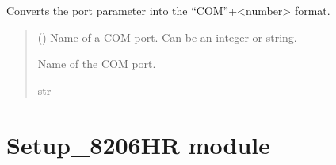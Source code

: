 \documentclass[letterpaper,10pt,english]{sphinxmanual}
\begin{document}
\begin{fulllineitems}

\begin{fulllineitems}
\label{\detokenize{SerialCommunication:SerialCommunication.COM_io.__BuildPortName}}
\pysigstartsignatures
{}
\pysigstopsignatures
\sphinxAtStartPar
Converts the port parameter into the “COM”+\textless{}number\textgreater{} format.
\begin{quote}\begin{description}
\sphinxAtStartPar
{} (\sphinxstyleliteralemphasis{\sphinxupquote{ | }}) \textendash{} Name of a COM port. Can be an integer or string.

\sphinxAtStartPar
Name of the COM port.

\sphinxAtStartPar
str

\end{description}\end{quote}

\end{fulllineitems}


\end{fulllineitems}


\sphinxstepscope


\section{Setup\_8206HR module}
\label{\detokenize{Setup_8206HR:module-Setup_8206HR}}\label{\detokenize{Setup_8206HR:setup-8206hr-module}}\label{\detokenize{Setup_8206HR::doc}}
\end{document}
